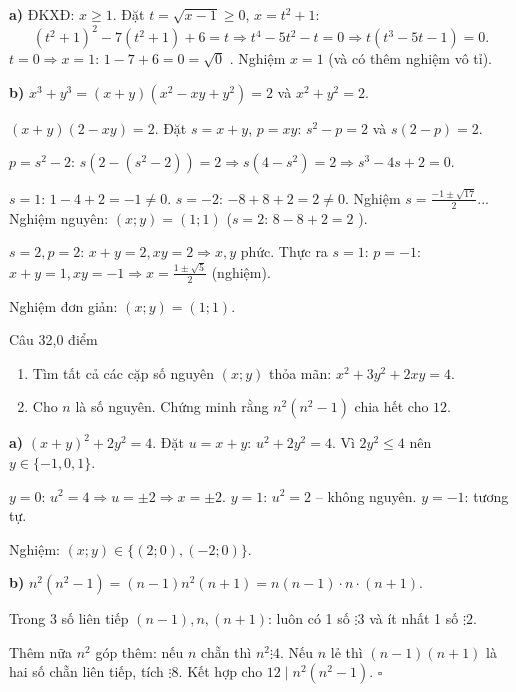 \begin{loi_giai_cau}
\textbf{a)} ĐKXĐ: $x\ge1$. Đặt $t=\sqrt{x-1}\ge0$, $x=t^2+1$:
\[(t^2+1)^2-7(t^2+1)+6=t \Rightarrow t^4-5t^2-t=0 \Rightarrow t(t^3-5t-1)=0.\]
$t=0\Rightarrow x=1$: $1-7+6=0=\sqrt{0}$ \checkmark . Nghiệm $\boxed{x=1}$ (và có thêm nghiệm vô tỉ).

\textbf{b)} $x^3+y^3=(x+y)(x^2-xy+y^2)=2$ và $x^2+y^2=2$.

$(x+y)(2-xy)=2$. Đặt $s=x+y$, $p=xy$: $s^2-p=2$ và $s(2-p)=2$.

$p=s^2-2$: $s(2-(s^2-2))=2\Rightarrow s(4-s^2)=2\Rightarrow s^3-4s+2=0$.

$s=1$: $1-4+2=-1\neq0$. $s=-2$: $-8+8+2=2\neq0$. Nghiệm $s=\frac{-1\pm\sqrt{17}}{2}$... Nghiệm nguyên: $(x;y)=(1;1)$ \checkmark  ($s=2$: $8-8+2=2$ \checkmark ).

$s=2,p=2$: $x+y=2,xy=2\Rightarrow x,y$ phức. Thực ra $s=1$: $p=-1$: $x+y=1,xy=-1\Rightarrow x=\frac{1\pm\sqrt{5}}{2}$ (nghiệm).

Nghiệm đơn giản: $\boxed{(x;y)=(1;1)}$.
\end{loi_giai_cau}

\begin{de_cau}{Câu 3}{2,0 điểm}
\begin{enumerate}[label=\alph*)]
  \item Tìm tất cả các cặp số nguyên $(x;y)$ thỏa mãn: $x^2 + 3y^2 + 2xy = 4$.
  \item Cho $n$ là số nguyên. Chứng minh rằng $n^2(n^2-1)$ chia hết cho $12$.
\end{enumerate}
\end{de_cau}

\begin{loi_giai_cau}
\textbf{a)} $(x+y)^2+2y^2=4$. Đặt $u=x+y$: $u^2+2y^2=4$. Vì $2y^2\le4$ nên $y\in\{-1,0,1\}$.

$y=0$: $u^2=4\Rightarrow u=\pm2\Rightarrow x=\pm2$.
$y=1$: $u^2=2$ -- không nguyên.
$y=-1$: tương tự.

Nghiệm: $\boxed{(x;y)\in\{(2;0),(-2;0)\}}$.

\textbf{b)} $n^2(n^2-1)=(n-1)n^2(n+1)=n(n-1)\cdot n\cdot(n+1)$.

Trong 3 số liên tiếp $(n-1),n,(n+1)$: luôn có 1 số $\vdots3$ và ít nhất 1 số $\vdots2$.

Thêm nữa $n^2$ góp thêm: nếu $n$ chẵn thì $n^2\vdots4$. Nếu $n$ lẻ thì $(n-1)(n+1)$ là hai số chẵn liên tiếp, tích $\vdots8$. Kết hợp cho $12\mid n^2(n^2-1)$. $\square$
\end{loi_giai_cau}

